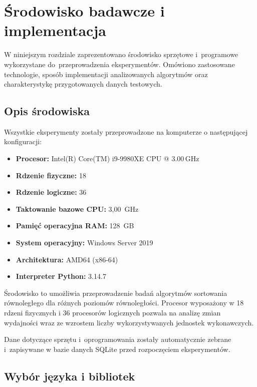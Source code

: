 \cleardoublepage
\chapter{Środowisko badawcze i implementacja}
\label{cha:SrodowiskoImplementacja}

W niniejszym rozdziale zaprezentowano środowisko sprzętowe i~programowe wykorzystane do~przeprowadzenia eksperymentów. 
Omówiono zastosowane technologie, sposób implementacji analizowanych algorytmów oraz charakterystykę przygotowanych danych testowych.

\section{Opis środowiska}
\label{sec:Srodowisko}

Wszystkie eksperymenty zostały przeprowadzone na komputerze o następującej konfiguracji:

\begin{itemize}
    \item \textbf{Procesor:} Intel(R) Core(TM) i9-9980XE CPU @ 3.00\,GHz
    \item \textbf{Rdzenie fizyczne:} 18
    \item \textbf{Rdzenie logiczne:} 36 
    \item \textbf{Taktowanie bazowe CPU:} 3,00~GHz
    \item \textbf{Pamięć operacyjna RAM:} 128~GB
    \item \textbf{System operacyjny:} Windows Server 2019
    \item \textbf{Architektura:} AMD64 (x86-64)
    \item \textbf{Interpreter Python:} 3.14.7
\end{itemize}

Środowisko to umożliwia przeprowadzenie badań algorytmów sortowania równoległego dla różnych poziomów równoległości. 
Procesor wyposażony w 18 rdzeni fizycznych i 36 procesorów logicznych pozwala na analizę zmian wydajności wraz ze wzrostem 
liczby wykorzystywanych jednostek wykonawczych.

Dane dotyczące sprzętu i~oprogramowania zostały automatycznie zebrane i~zapisywane w bazie danych SQLite przed rozpoczęciem eksperymentów.

\section{Wybór języka i bibliotek}
\label{sec:JezykBiblioteki}

